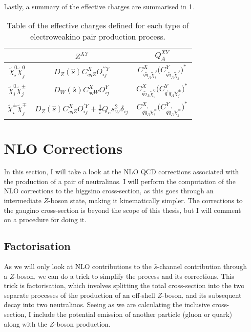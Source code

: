 \documentclass[../main.tex]{subfiles}
\begin{document}
Lastly, a summary of the effective charges are summarised in \cref{pc:tab:eff_charges}.

{\renewcommand{\arraystretch}{2}
\begin{table}
  \centering
  \begin{tabular}{|c|cc|}
    \hline
                                          & \(Z^{XY}\)                                                                             & \(Q_A^{XY}\)                                                                                                   \\
    \hline
    \(\tilde\chi^0_i \tilde\chi^0_j\)     & \(D_Z(\hat{s}) C_{qqZ}^X O_{ij}^{\prime\prime Y}\)                                     & \(C_{q\tilde{q}_A \tilde\chi^0_i}^X \bigl(C_{q\tilde{q}_A \tilde\chi^0_j}^Y\bigr)^{\!\ast}\)                   \\
    \(\tilde\chi^0_i \tilde\chi^\pm_j\)   & \(D_W(\hat{s}) C_{qqW}^X O_{ij}^{Y}\)                                                  & \(C_{q\tilde{q}_A \tilde\chi^0_i}^X \bigl(C_{q^\prime \tilde{q}_A \tilde\chi^\pm_j}^Y\bigr)^{\!\ast}\)         \\
    \(\tilde\chi^\pm_i \tilde\chi^\mp_j\) & \(D_Z(\hat{s}) C_{qqZ}^X O_{ij}^{\prime Y} + \frac{1}{\hat{s}} Q_e s_W^2 \delta_{ij}\) & \(C_{q\tilde{q}^\prime_A \tilde\chi^\pm_i}^X \bigl(C_{q\tilde{q}^\prime_A \tilde\chi^\pm_j}^Y\bigr)^{\!\ast}\) \\
    \hline
  \end{tabular}
  \caption{Table of the effective charges defined for each type of electroweakino pair production process.}
  \label{pc:tab:eff_charges}
\end{table}


}



\section{NLO Corrections}
In this section, I will take a look at the NLO QCD corrections associated with the production of a pair of neutralinos.
I will perform the computation of the NLO corrections to the higgsino cross-section, as this goes through an intermediate \(Z\)-boson state, making it kinematically simpler.
The corrections to the gaugino cross-section is beyond the scope of this thesis, but I will comment on a procedure for doing it.

\subsection{Factorisation}
As we will only look at NLO contributions to the \(\hat{s}\)-channel contribution through a \(Z\)-boson, we can do a trick to simplify the process and its corrections.
This trick is factorisation, which involves splitting the total cross-section into the two separate processes of the production of an off-shell \(Z\)-boson, and its subsequent decay into two neutralinos.
Seeing as we are calculating the inclusive cross-section, I include the potential emission of another particle (gluon or quark) along with the \(Z\)-boson production.
\end{document}
